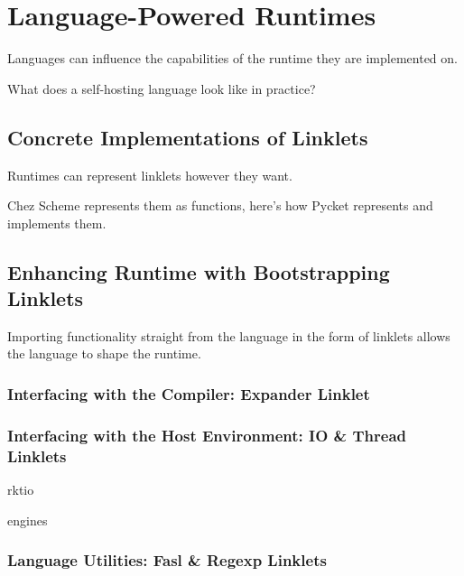\chapter{Language-Powered Runtimes}
	\begin{mainpoint}
		Languages can influence the capabilities of the runtime they are implemented on.

		What does a self-hosting language look like in practice?

	\end{mainpoint}

	\section{Concrete Implementations of Linklets}

		\begin{mainpoint}
			Runtimes can represent linklets however they want.

			Chez Scheme represents them as functions, here's how Pycket represents and implements them.
		\end{mainpoint}

	\section{Enhancing Runtime with Bootstrapping Linklets}
		\begin{mainpoint}
			Importing functionality straight from the language in the form of linklets allows the language to shape the runtime.
		\end{mainpoint}
		\subsection{Interfacing with the Compiler: Expander Linklet}

		\subsection{Interfacing with the Host Environment: IO \& Thread Linklets}
			\begin{placeholder}[TODO]
				rktio
			\end{placeholder}
			\begin{placeholder}[TODO]
				engines
			\end{placeholder}
		\subsection{Language Utilities: Fasl \& Regexp Linklets}

	
